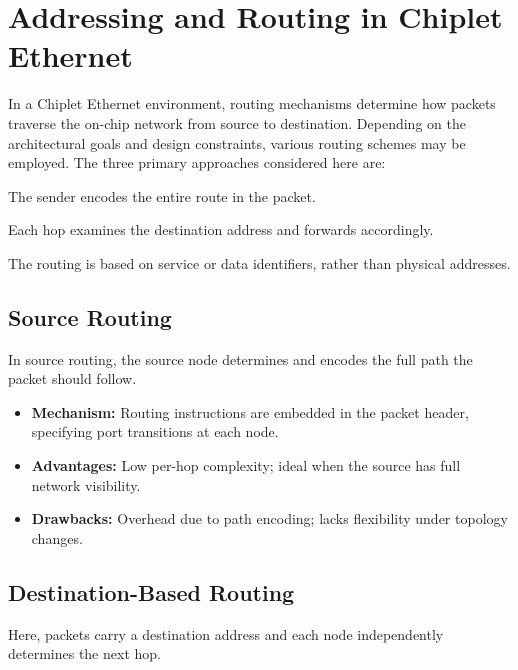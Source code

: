 \documentclass[../../../OAE-SPEC-MAIN.tex]{subfiles}
\begin{document}
\section{Addressing and Routing in Chiplet Ethernet}

In a Chiplet Ethernet environment, routing mechanisms determine how packets traverse the on-chip network from source to destination. Depending on the architectural goals and design constraints, various routing schemes may be employed. The three primary approaches considered here are:

\begin{description}[leftmargin=0pt, itemsep=0.5ex]
\item[\textbf{Source Routing}] The sender encodes the entire route in the packet.
\item[\textbf{Destination-Based Routing}] Each hop examines the destination address and forwards accordingly.
\item[\textbf{Name-Based Routing}] The routing is based on service or data identifiers, rather than physical addresses.
\end{description}

\subsection{Source Routing}

In source routing, the source node determines and encodes the full path the packet should follow.

\begin{itemize}
\item \textbf{Mechanism:} Routing instructions are embedded in the packet header, specifying port transitions at each node.
\item \textbf{Advantages:} Low per-hop complexity; ideal when the source has full network visibility.
\item \textbf{Drawbacks:} Overhead due to path encoding; lacks flexibility under topology changes.
\end{itemize}

\subsection{Destination-Based Routing}

Here, packets carry a destination address and each node independently determines the next hop.
\end{document}
